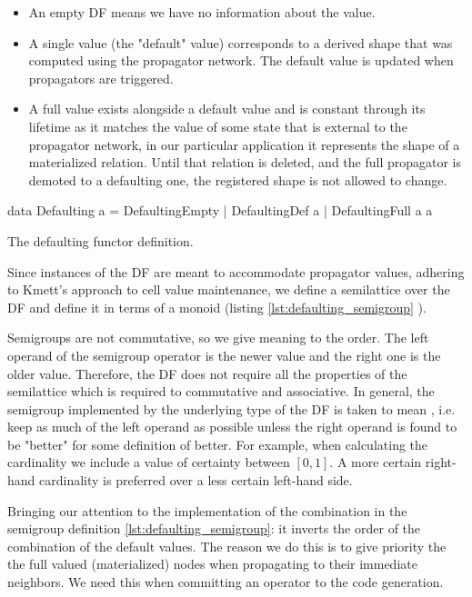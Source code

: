 \begin{itemize}
\item An empty DF means we have no information about the value.
\item A single value (the "default" value) corresponds to a derived shape
  that was computed using the propagator network. The default value is
  updated when propagators are triggered.
\item A full value exists alongside a default value and is constant
  through its lifetime as it matches the value of some state that is
  external to the propagator network, in our particular application it
  represents the shape of a materialized relation. Until that relation
  is deleted, and the full propagator is demoted to a defaulting one, the
  registered shape is not allowed to change.
\end{itemize}

\begin{code}
  \begin{haskellcode}
    data Defaulting a =
      DefaultingEmpty
      | DefaultingDef a
      | DefaultingFull a a
  \end{haskellcode}
  \label{lst:defaulting_functor}
  \caption{The defaulting functor definition.}
\end{code}

Since instances of the DF are meant to accommodate propagator values,
adhering to Kmett's approach to cell value maintenance, we define a
semilattice over the DF and define it in terms of a monoid (listing
\ref{lst:defaulting_semigroup} ).

Semigroups are not commutative, so we give meaning to the order. The
left operand of the semigroup operator is the newer value and the
right one is the older value. Therefore, the DF does not require all
the properties of the semilattice which is required to commutative and
associative. In general, the semigroup implemented by the underlying
type of the DF is taken to mean , i.e. keep as
much of the left operand as possible unless the right operand is found
to be "better" for some definition of better. For example, when calculating
the cardinality we include a value of certainty between \(\left[0,1\right]\).
A more certain right-hand cardinality is preferred over a less certain left-hand side.

Bringing our attention to the implementation of the 
combination in the semigroup definition \ref{lst:defaulting_semigroup}:
it inverts the order of the combination of the default
values. The reason we do this is to give priority the the full valued
(materialized) nodes when propagating to their immediate neighbors. We
need this when committing an operator to the code generation.

